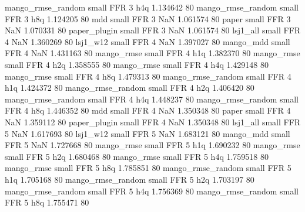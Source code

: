 mango_rmse_random      small      FFR                 3                  h4q 1.134642 80
mango_rmse_random      small      FFR                 3                  h8q 1.124205 80
              mdd      small      FFR                 3                  NaN 1.061574 80
            paper      small      FFR                 3                  NaN 1.070331 80
     paper_plugin      small      FFR                 3                  NaN 1.061574 80
         lsj1_all      small      FFR                 4                  NaN 1.360269 80
         lsj1_w12      small      FFR                 4                  NaN 1.397027 80
        mango_mdd      small      FFR                 4                  NaN 1.431163 80
       mango_rmse      small      FFR                 4                  h1q 1.382370 80
       mango_rmse      small      FFR                 4                  h2q 1.358555 80
       mango_rmse      small      FFR                 4                  h4q 1.429148 80
       mango_rmse      small      FFR                 4                  h8q 1.479313 80
mango_rmse_random      small      FFR                 4                  h1q 1.424372 80
mango_rmse_random      small      FFR                 4                  h2q 1.406420 80
mango_rmse_random      small      FFR                 4                  h4q 1.448237 80
mango_rmse_random      small      FFR                 4                  h8q 1.446352 80
              mdd      small      FFR                 4                  NaN 1.350348 80
            paper      small      FFR                 4                  NaN 1.359112 80
     paper_plugin      small      FFR                 4                  NaN 1.350348 80
         lsj1_all      small      FFR                 5                  NaN 1.617693 80
         lsj1_w12      small      FFR                 5                  NaN 1.683121 80
        mango_mdd      small      FFR                 5                  NaN 1.727668 80
       mango_rmse      small      FFR                 5                  h1q 1.690232 80
       mango_rmse      small      FFR                 5                  h2q 1.680468 80
       mango_rmse      small      FFR                 5                  h4q 1.759518 80
       mango_rmse      small      FFR                 5                  h8q 1.785851 80
mango_rmse_random      small      FFR                 5                  h1q 1.705168 80
mango_rmse_random      small      FFR                 5                  h2q 1.703197 80
mango_rmse_random      small      FFR                 5                  h4q 1.756369 80
mango_rmse_random      small      FFR                 5                  h8q 1.755471 80
